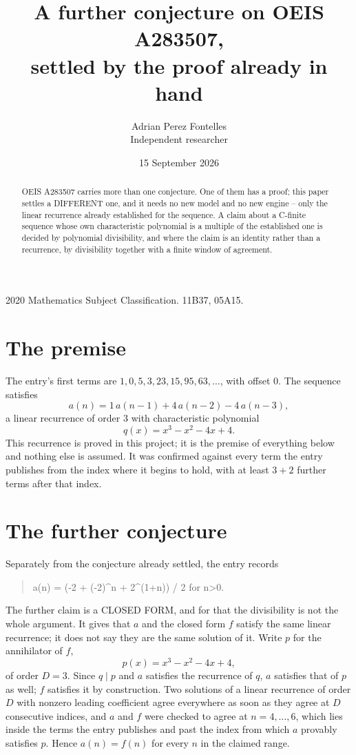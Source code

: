 \documentclass[11pt,a4paper]{article}
\title{A further conjecture on OEIS A283507,\\ \large settled by the proof already in hand}
\author{Adrian Perez Fontelles\\ \small Independent researcher}
\date{15 September 2026}
\theoremstyle{plain}
\theoremstyle{definition}
\begin{document}
\maketitle

\begin{abstract}
OEIS A283507 carries more than one conjecture. One of them has a proof; this paper settles a
DIFFERENT one, and it needs no new model and no new engine -- only the linear recurrence already
established for the sequence. A claim about a C-finite sequence whose own characteristic
polynomial is a multiple of the established one is decided by polynomial divisibility, and where
the claim is an identity rather than a recurrence, by divisibility together with a finite window
of agreement.
\end{abstract}

\noindent\small 2020 Mathematics Subject Classification. 11B37, 05A15.\normalsize

\section{The premise}

The entry's first terms are $1, 0, 5, 3, 23, 15, 95, 63,\dots$, with offset $0$. The sequence satisfies
\[
  a(n)=1\,a(n-1) + 4\,a(n-2) - 4\,a(n-3) ,
\]
a linear recurrence of order $3$ with characteristic polynomial
\[
  q(x)=x^{3} - x^{2} - 4 x + 4 .
\]
This recurrence is proved in this project; it is the premise of everything below and nothing else is assumed.
It was confirmed against every term the entry publishes from the index where it begins to hold,
with at least $3+2$ further terms after that index.

\section{The further conjecture}

Separately from the conjecture already settled, the entry records

\begin{quote}\raggedright a(n) = (-2 + (-2)\^{}n + 2\^{}(1+n)) / 2 for n>0.\end{quote}

The further claim is a CLOSED FORM, and for that the divisibility is not the whole argument. It
gives that $a$ and the closed form $f$ satisfy the same linear recurrence; it does not say they
are the same solution of it. Write $p$ for the annihilator of $f$,
\[
  p(x)=x^{3} - x^{2} - 4 x + 4 ,
\]
of order $D=3$. Since $q\mid p$ and $a$ satisfies the recurrence of $q$, $a$ satisfies that of
$p$ as well; $f$ satisfies it by construction. Two solutions of a linear recurrence of order $D$
with nonzero leading coefficient agree everywhere as soon as they agree at $D$ consecutive
indices, and $a$ and $f$ were checked to agree at $n=4,\dots,6$,
which lies inside the terms the entry publishes and past the index from which $a$ provably
satisfies $p$. Hence $a(n)=f(n)$ for every $n$ in the claimed range.
\end{document}
